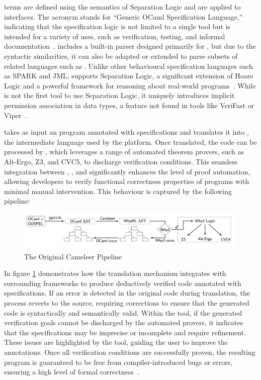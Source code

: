 \gospel terms are defined using the semantics of Separation Logic and are applied to \ocaml interfaces. The acronym \gospel stands 
for “Generic OCaml Specification Language,” indicating that the specification logic is not limited to a single tool but is intended 
for a variety of uses, such as verification, testing, and informal documentation~\cite{ChargueraudFLP19}. \gospel includes a built-in 
parser designed primarily for \ocaml, but due to the syntactic similarities, it can also be adapted or extended to parse subsets of 
related languages such as \cml. Unlike other behavioural specification languages such as \textsf{SPARK} and \textsf{JML}, \gospel 
supports Separation Logic, a significant extension of Hoare Logic and a powerful framework for reasoning about real-world 
programs~\cite{Reynolds02, OHearnRY01}. While \gospel is not the first tool to use Separation Logic, it uniquely introduces implicit 
permission association in data types, a feature not found in tools like \textsf{VeriFast} or \textsf{Viper}~\cite{ChargueraudFLP19}.

\cameleer takes as input an \ocaml program annotated with \gospel specifications and translates it into \whyml, the intermediate 
language used by the \whythree platform. Once translated, the code can be processed by \whythree, which leverages a range of automated 
theorem provers, such as Alt-Ergo, Z3, and CVC5, to discharge verification conditions. This seamless integration between \cameleer, 
\gospel, and \whythree significantly enhances the level of proof automation, allowing developers to verify functional correctness 
properties of \ocaml programs with minimal manual intervention. This behaviour is captured by the following pipeline:

\begin{figure}[H]
    \centering
    \includegraphics[width=\linewidth]{images/Cameleer_From_Paper.png}
    \caption{The Original Cameleer Pipeline~\cite{PereiraR20}}
    \label{fig:CameleerPipeline}
\end{figure}

In figure \ref{fig:CameleerPipeline} demonstrates how the translation mechanism integrates with surrounding frameworks to produce 
deductively verified \ocaml code annotated with \gospel specifications. If an error is detected in the original \ocaml code during 
translation, the process reverts to the source, requiring corrections to ensure that the generated \whyml code is syntactically and 
semantically valid. Within the \whythree tool, if the generated verification goals cannot be discharged by the automated provers, it indicates 
that the specifications may be imprecise or incomplete and require refinement. These issues are highlighted by the tool, guiding the 
user to improve the annotations. Once all verification conditions are successfully proven, the resulting program is guaranteed to 
be free from compiler-introduced bugs or errors, ensuring a high level of formal correctness~\cite{Filliatre11}.

